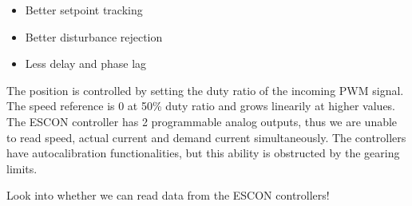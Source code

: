 \begin{itemize}
	\item Better setpoint tracking
	\item Better disturbance rejection
	\item Less delay and phase lag
\end{itemize}

The position is controlled by setting the duty ratio of the incoming PWM signal. The speed reference is 0 at 50\% duty ratio and grows linearily at higher values.
The ESCON controller has 2 programmable analog outputs, thus we are unable to read speed, actual current and demand current simultaneously.
The controllers have autocalibration functionalities, but this ability is obstructed by the gearing limits.


Look into whether we can read data from the ESCON controllers!